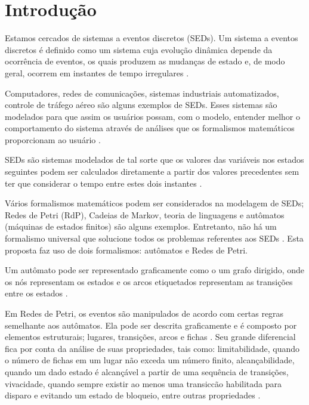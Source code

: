 \chapter{Introdu\c{c}\~ao}




Estamos cercados de sistemas a eventos discretos (SEDs). Um sistema a eventos discretos \'e definido como um sistema cuja evolu\c{c}\~ao din\^amica depende da ocorr\^encia de eventos, os quais produzem as mudan\c{c}as de estado e, de modo geral, ocorrem em instantes de tempo irregulares \cite{Montgomery2004}. 

Computadores, redes de comunica\c{c}\~oes, sistemas industriais automatizados, controle de tr\'afego a\'ereo s\~ao alguns exemplos de SEDs. Esses sistemas s\~ao modelados para que assim os usu\'arios possam, com o modelo, entender melhor o comportamento do sistema atrav\'es de an\'alises que os formalismos matem\'aticos proporcionam ao usu\'ario \cite{Wolfgang2013}.

SEDs s\~ao sistemas modelados de tal sorte que os valores das vari\'aveis nos estados seguintes podem ser calculados diretamente a partir dos valores precedentes sem ter que considerar o tempo entre estes dois instantes \cite{Janette}.

V\'arios formalismos matem\'aticos podem ser considerados na modelagem de SEDs; Redes de Petri (RdP), Cadeias de Markov, teoria de linguagens e aut\^omatos (m\'aquinas de estados finitos) s\~ao alguns exemplos. Entretanto, n\~ao h\'a um formalismo universal que solucione todos os problemas referentes aos SEDs \cite{Montgomery2004}. Esta proposta faz uso de dois formalismos: aut\^omatos e Redes de Petri.


Um aut\^omato pode ser representado graficamente como o um grafo dirigido, onde os n\'os representam os estados e os arcos etiquetados representam as transi\c{c}\~oes entre os estados \cite{apostilacury}.

Em Redes de Petri, os eventos s\~ao manipulados de acordo com certas regras semelhante aos aut\^omatos. Ela pode ser descrita graficamente e \'e composto por elementos estruturais; lugares, transi\c{c}\~oes, arcos e fichas \cite{Cassandras2008}. Seu grande diferencial fica por conta da an\'alise de suas propriedades, tais como: limitabilidade, quando o n\'umero de fichas em um lugar n\~ao exceda um n\'umero finito, alcan\c{c}abilidade, quando um dado estado \'e alcan\c{c}\'avel a partir de uma sequ\^encia de transi\c{c}\~oes, vivacidade, quando sempre existir ao menos uma transic{c}\~ao habilitada para disparo e evitando um estado de bloqueio, entre outras propriedades \cite{Cassandras2008}.

